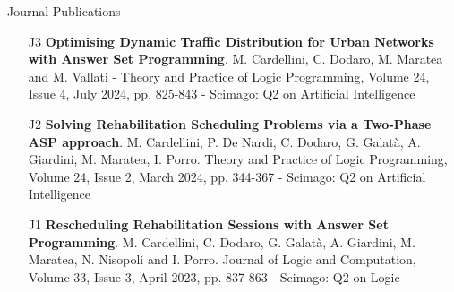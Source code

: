 \documentclass{resume} %
\begin{document}

\begin{rSection}{Journal Publications}
\begin{enumerate}[leftmargin=5mm]
	\item[J3] \textbf{Optimising Dynamic Traffic Distribution for Urban Networks with Answer Set Programming}. M. Cardellini, C. Dodaro, M. Maratea and M. Vallati - Theory and Practice of Logic Programming,  Volume 24, Issue 4, July 2024, pp. 825-843 - Scimago: Q2 on Artificial Intelligence
	\item[J2] \textbf{Solving Rehabilitation Scheduling Problems via a Two-Phase ASP approach}. M. Cardellini, P. De Nardi, C. Dodaro, G. Galat\`a, A. Giardini, M. Maratea, I. Porro. Theory and Practice of Logic Programming, Volume 24, Issue 2, March 2024, pp. 344-367 - Scimago: Q2 on Artificial Intelligence
	\item[J1] \textbf{Rescheduling Rehabilitation Sessions with Answer Set Programming}. M. Cardellini, C. Dodaro, G. Galat\`a, A. Giardini, M. Maratea, N. Nisopoli and I. Porro. Journal of Logic and Computation, Volume 33, Issue 3, April 2023, pp. 837-863 - Scimago: Q2 on Logic
\end{enumerate}
\end{rSection}
\end{document}
